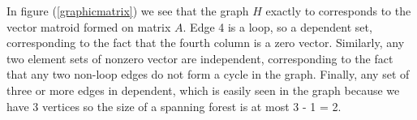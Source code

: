 In figure (\ref{graphicmatrix}) we see that the graph $H$ exactly to corresponds to the vector matroid formed on matrix $A$. Edge 4 is a loop, so a dependent set, corresponding to the fact that the fourth column is a zero vector. Similarly, any two element sets of nonzero vector are independent, corresponding to the fact that any two non-loop edges do not form a cycle in the graph. Finally, any set of three or more edges in dependent, which is easily seen in the graph because we have 3 vertices so the size of a spanning forest is at most 3 - 1 = 2.

